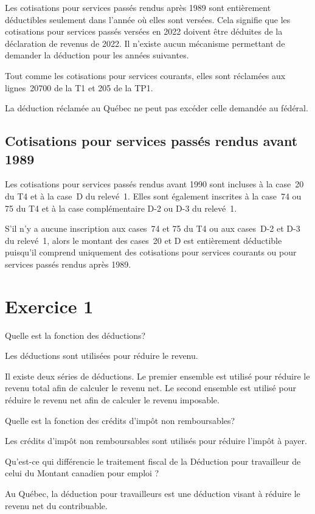 Les cotisations pour services passés rendus après 1989 sont entièrement déductibles seulement dans l'année où elles sont versées. Cela signifie que les cotisations pour services passés versées en 2022 doivent être déduites de la déclaration de revenus de 2022. Il n'existe aucun mécanisme permettant de demander la déduction pour les années suivantes.

Tout comme les cotisations pour services courants, elles sont réclamées aux lignes~20700 de la T1 et 205 de la TP1.

La déduction réclamée au Québec ne peut pas excéder celle demandée au fédéral.


\subsection{Cotisations pour services passés rendus avant 1989}
Les cotisations pour services passés rendus avant 1990 sont incluses à la case~20 du T4 et à la case~D du relevé~1. Elles sont également inscrites à la case~74 ou 75 du T4 et à la case complémentaire D-2 ou D-3 du relevé~1.

S'il n'y a aucune inscription aux cases~74 et 75 du T4 ou aux cases~D-2 et D-3 du relevé~1, alors le montant des cases~20 et D est entièrement déductible puisqu'il comprend uniquement des cotisations pour services courants ou pour services passés rendus après 1989.



\section{Exercice 1}
\setcounter{question}{0}
\begin{question}
	Quelle est la fonction des déductions?
\end{question}
Les déductions sont utilisées pour réduire le revenu.

Il existe deux séries de déductions. Le premier ensemble est utilisé pour réduire le revenu total afin de calculer le revenu net. Le second ensemble est utilisé pour réduire le revenu net afin de calculer le revenu imposable.

\begin{question}
	Quelle est la fonction des crédits d'impôt non remboursables?
\end{question}
Les crédits d'impôt non remboursables sont utilisés pour réduire l'impôt à payer.

\begin{question}
	Qu'est-ce qui différencie le traitement fiscal de la \og Déduction pour travailleur \fg{} de celui du \og Montant canadien pour emploi \fg{}? 
\end{question}
Au Québec, la déduction pour travailleurs est une déduction visant à réduire le revenu net du contribuable.

